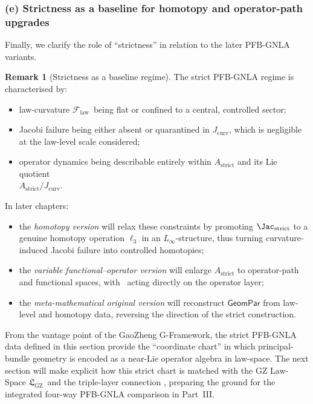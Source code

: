 \documentclass[11pt]{book}
\theoremstyle{plain}
\theoremstyle{definition}
\newtheorem{remark}[theorem]{Remark}
\newcommand{\GZLS}{\ensuremath{\mathfrak{L}_{\mathrm{GZ}}}}       \newcommand{\GZLT}{\ensuremath{M_{!w}}}                           \newcommand{\GZLOC}{\ensuremath{A_M}}                             \newcommand{\GZLCurv}{\ensuremath{\mathcal{F}_{\mathrm{law}}}}
\begin{document}
\subsubsection*{(e) Strictness as a baseline for homotopy and operator-path upgrades}

Finally, we clarify the role of “strictness” in relation to the later
PFB-GNLA variants.

\begin{remark}[Strictness as a baseline regime]
The strict PFB-GNLA regime is characterised by:
  \begin{itemize}
    \item law-curvature \GZLCurv\ being flat or confined to a central,
          controlled sector;
    \item Jacobi failure being either absent or quarantined in
          $J_{\mathrm{curv}}$, which is negligible at the law-level
          scale considered;
    \item operator dynamics being describable entirely within
          $A_{\mathrm{strict}}$ and its Lie quotient \\
          $A_{\mathrm{strict}}/J_{\mathrm{curv}}$.
  \end{itemize}
  In later chapters:
  \begin{itemize}
    \item the \emph{homotopy version} will relax these constraints by
          promoting $\Jac_{\mathrm{strict}}$ to a genuine homotopy
          operation $\ell_3$ in an $L_\infty$-structure, thus turning
          curvature-induced Jacobi failure into controlled homotopies;
    \item the \emph{variable functional–operator version} will enlarge
          $A_{\mathrm{strict}}$ to operator-path and functional spaces,
          with \GZTLC\ acting directly on the operator layer;
    \item the \emph{meta-mathematical original version} will reconstruct
          $\mathsf{GeomPar}$ from law-level and homotopy data, reversing
          the direction of the strict construction.
  \end{itemize}
\end{remark}

From the vantage point of the GaoZheng G-Framework, the strict
PFB-GNLA data defined in this section provide the “coordinate chart”
in which principal-bundle geometry is encoded as a near-Lie operator
algebra in law-space. The next section will make explicit how this
strict chart is matched with the GZ Law-Space \GZLS\ and the triple-layer
connection \GZTLC, preparing the ground for the integrated four-way
PFB-GNLA comparison in Part~III.
\end{document}
